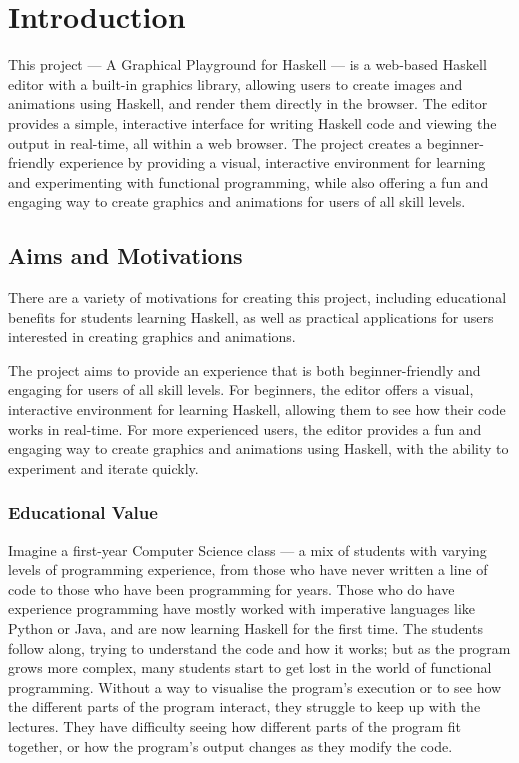 \documentclass[../main.tex]{subfiles}
\begin{document}
\chapter{Introduction} \label{ch:introduction}
    This project — A Graphical Playground for Haskell — is a web-based Haskell
        editor with a built-in graphics library, allowing users to create images and
        animations using Haskell, and render them directly in the browser.
    The editor provides a simple, interactive interface for writing Haskell code
        and viewing the output in real-time, all within a web browser.
    The project creates a beginner-friendly experience by providing a visual,
        interactive environment for learning and experimenting with functional
        programming, while also offering a fun and engaging way to create graphics and
        animations for users of all skill levels.

    \section{Aims and Motivations}
        There are a variety of motivations for creating this project, including
            educational benefits for students learning Haskell, as well as practical
            applications for users interested in creating graphics and animations.

        The project aims to provide an experience that is both beginner-friendly and
            engaging for users of all skill levels.
        For beginners, the editor offers a visual, interactive environment for learning
            Haskell, allowing them to see how their code works in real-time.
        For more experienced users, the editor provides a fun and engaging way to
            create graphics and animations using Haskell, with the ability to experiment
            and iterate quickly.

        \subsection{Educational Value}
            Imagine a first-year Computer Science class — a mix of students with varying
                levels of programming experience, from those who have never written a line of
                code to those who have been programming for years.
            Those who do have experience programming have mostly worked with imperative
                languages like Python or Java, and are now learning Haskell for the first time.
            The students follow along, trying to understand the code and how it works; but
                as the program grows more complex, many students start to get lost in the world
                of functional programming.
            Without a way to visualise the program's execution or to see how the different
                parts of the program interact, they struggle to keep up with the lectures.
            They have difficulty seeing how different parts of the program fit together, or
                how the program's output changes as they modify the code.
\end{document}
